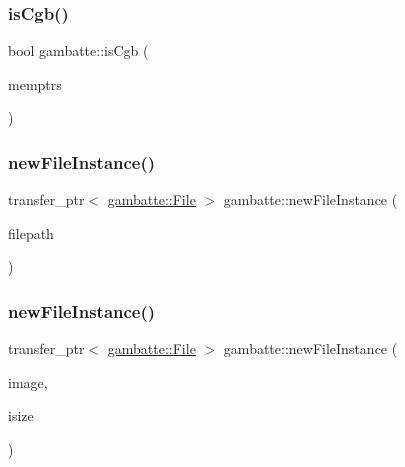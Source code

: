 \mbox{\label{namespacegambatte_ab1d61954307082098268b1f79c08e83a}} 
\subsubsection{\texorpdfstring{is\+Cgb()}{isCgb()}}
{\footnotesize\ttfamily bool gambatte\+::is\+Cgb (\begin{DoxyParamCaption}\item[{\hyperlink{classgambatte_1_1MemPtrs}{Mem\+Ptrs} const \&}]{memptrs }\end{DoxyParamCaption})\hspace{0.3cm}{\ttfamily [inline]}}

\mbox{\label{namespacegambatte_a51d0f5378b3d6fdb328a94ba700b1560}} 
\subsubsection{\texorpdfstring{new\+File\+Instance()}{newFileInstance()}\hspace{0.1cm}{\footnotesize\ttfamily [1/2]}}
{\footnotesize\ttfamily transfer\+\_\+ptr$<$ \hyperlink{classgambatte_1_1File}{gambatte\+::\+File} $>$ gambatte\+::new\+File\+Instance (\begin{DoxyParamCaption}\item[{std\+::string const \&}]{filepath }\end{DoxyParamCaption})}

\mbox{\label{namespacegambatte_a3188aac596e08a6a6aad75a00b50abdb}} 
\subsubsection{\texorpdfstring{new\+File\+Instance()}{newFileInstance()}\hspace{0.1cm}{\footnotesize\ttfamily [2/2]}}
{\footnotesize\ttfamily transfer\+\_\+ptr$<$ \hyperlink{classgambatte_1_1File}{gambatte\+::\+File} $>$ gambatte\+::new\+File\+Instance (\begin{DoxyParamCaption}\item[{const unsigned char $\ast$}]{image,  }\item[{size\+\_\+t}]{isize }\end{DoxyParamCaption})}

